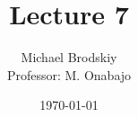


\title{Lecture 7}
\date{\today}
\author{Michael Brodskiy\\ \small Professor: M. Onabajo}



\maketitle

